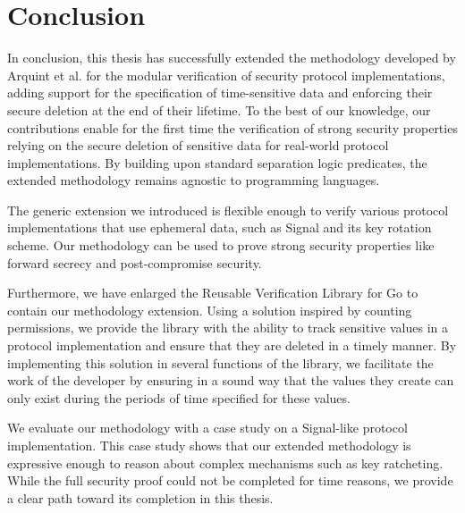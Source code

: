 \chapter{Conclusion}
\label{chap:conclusion}

In conclusion, this thesis has successfully extended the methodology developed by Arquint et al. for the modular verification of security protocol implementations, adding support for the specification of time-sensitive data and enforcing their secure deletion at the end of their lifetime.
To the best of our knowledge, our contributions enable for the first time the verification of strong security properties relying on the secure deletion of sensitive data for real-world protocol implementations.
By building upon standard separation logic predicates, the extended methodology remains agnostic to programming languages.

The generic extension we introduced is flexible enough to verify various protocol implementations that use ephemeral data, such as Signal and its key rotation scheme. Our methodology can be used to prove strong security properties like forward secrecy and post-compromise security.

Furthermore, we have enlarged the Reusable Verification Library for Go to contain our methodology extension.
Using a solution inspired by counting permissions, we provide the library with the ability to track sensitive values in a protocol implementation and ensure that they are deleted in a timely manner.
By implementing this solution in several functions of the library, we facilitate the work of the developer by ensuring in a sound way that the values they create can only exist during the periods of time specified for these values.

We evaluate our methodology with a case study on a Signal-like protocol implementation.
This case study shows that our extended methodology is expressive enough to reason about complex mechanisms such as key ratcheting.
While the full security proof could not be completed for time reasons, we provide a clear path toward its completion in this thesis.

